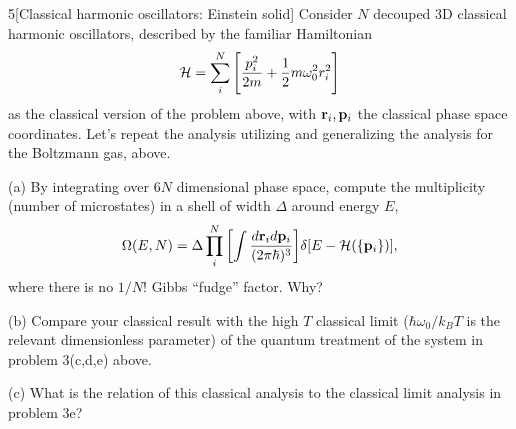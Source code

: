 \documentclass[12pt]{article}
\begin{document}
\begin{problem}{5}[Classical harmonic oscillators: Einstein solid]
Consider $N$ decouped 3D classical harmonic oscillators, described by the
familiar Hamiltonian
\begin{equation}
    \mathcal{H}=\sum_i^N\qty[\frac{p_i^2}{2m}+\frac12m\omega_0^2r_i^2] 
\end{equation}
as the classical version of the problem above, with $\vb{r}_i,\vb{p}_i$ the
classical phase space coordinates. Let's repeat the analysis utilizing and
generalizing the analysis for the Boltzmann gas, above.

(a) By integrating over $6N$ dimensional phase space, compute the multiplicity
(number of microstates) in a shell of width $\Delta$ around energy $E$,
\begin{equation}
    \Omega(E,N)=\Delta\prod_i^N\qty[\int\frac{d\vb{r}_id\vb{p}_i}{(2\pi\hbar)^3}]\delta[E-\mathcal{H}(\qty{\vb{p}_i})],
\end{equation}
where there is no $1/N!$ Gibbs ``fudge'' factor. Why?

(b) Compare your classical result with the high $T$ classical limit
($\hbar\omega_0/k_BT$ is the relevant dimensionless parameter) of the quantum
treatment of the system in problem 3(c,d,e) above.

(c) What is the relation of this classical analysis to the classical limit
analysis in problem 3e?
\begin{solution}
\end{solution}
\end{problem}
    
\end{document}

